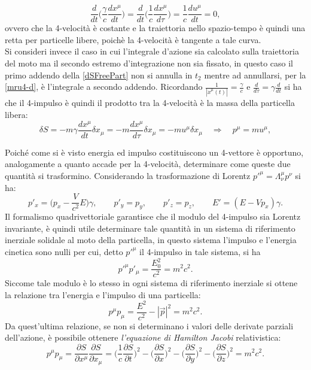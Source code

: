 \begin{equation}
    \frac{d}{dt}\bigg(\frac{\gamma}{c} \frac{dx^\mu}{dt}\bigg)=\frac{d}{dt}\bigg(\frac{1}{c} \frac{dx^\mu}{d\tau}\bigg)=\frac{1}{c}\frac{du^\mu}{dt}=0\label{mru4-d},
\end{equation}
ovvero che la 4-velocità è costante e la traiettoria nello spazio-tempo è quindi una retta per particelle libere, poichè la 4-velocità è tangente a tale curva.\\

Si consideri invece il caso in cui l'integrale d'azione sia calcolato sulla traiettoria del moto ma il secondo estremo d'integrazione non sia fissato, in questo caso il primo addendo della \eqref{dSFreePart} non si annulla in $t_2$ mentre ad annullarsi, per la \eqref{mru4-d}, è l'integrale a secondo addendo. Ricordando $\frac{1}{|\dot{x}^\mu(t)|}=\frac{\gamma}{c}$ e $\frac{d}{d\tau}=\gamma\frac{d}{dt}$ si ha che il 4-impulso è quindi il prodotto tra la 4-velocità è la massa della particella libera:
\begin{equation}
    \delta S=-m\gamma\frac{dx^\mu}{dt}\delta x_\mu=-m\frac{dx^\mu}{d\tau}\delta x_\mu=-m u^\mu\delta x_\mu \quad \Rightarrow \quad p^\mu=m u^\mu,
\end{equation}

Poiché come si è visto energia ed impulso costituiscono un 4-vettore è opportuno, analogamente a quanto accade per la 4-velocità, determinare come queste due quantità si trasformino. Considerando la trasformazione di Lorentz $p'^\mu=\Lambda_\nu^\mu p^\nu$ si ha:
\begin{equation}
    p'_x=\bigg(p_x-\frac{V}{c^2}E\bigg)\gamma,\qquad p'_y=p_y,\qquad p'_z=p_z,\qquad E'=(E-Vp_x)\gamma.
    \label{TrasfLorentzEI}
\end{equation}
Il formalismo quadrivettoriale garantisce che il modulo del 4-impulso sia Lorentz invariante, è quindi utile determinare tale quantità in un sistema di riferimento inerziale solidale al moto della particella, in questo sistema l'impulso e l'energia cinetica sono nulli per cui, detto $p'^\mu$ il 4-impulso in tale sistema, si ha
\begin{equation*}
    p'^\mu p'_\mu=\frac{E_0^2}{c^2}=m^2c^2.
\end{equation*}  
Siccome tale modulo è lo stesso in ogni sistema di riferimento inerziale si ottene la relazione tra l'energia e l'impulso di una particella:
\begin{equation}
    p^\mu p_\mu=\frac{E^2}{c^2}-|\vec p |^2=m^2c^2.
    \label{relazioneEnergiaImpulso}
\end{equation}
Da quest'ultima relazione, se non si determinano i valori delle derivate parziali dell'azione, è possibile ottenere \emph{l'equazione di Hamilton Jacobi} relativistica:
\begin{equation}
    p^\mu p_\mu=\frac{\partial S }{\partial x^\mu}\frac{\partial S }{\partial x_\mu}=\bigg(\frac{1}{c}\frac{\partial S }{\partial t}\bigg)^2-\bigg(\frac{\partial S }{\partial x}\bigg)^2-\bigg(\frac{\partial S }{\partial y}\bigg)^2-\bigg(\frac{\partial S }{\partial z}\bigg)^2=m^2c^2.
\end{equation}
